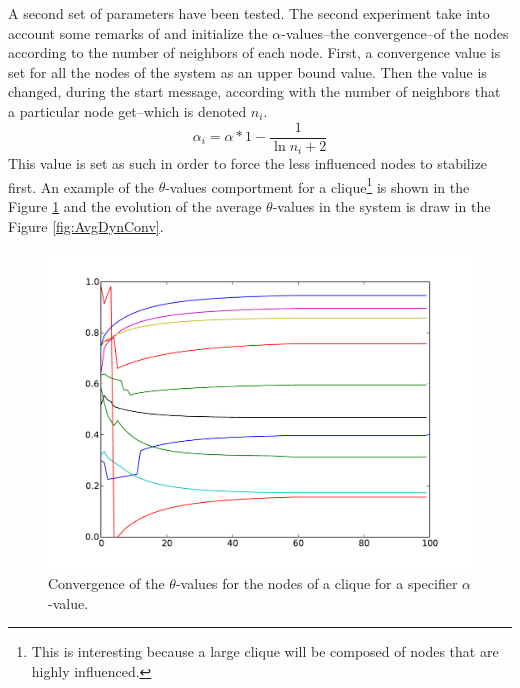 \documentclass[letterpaper]{article}
\begin{document}
A second set of parameters have been tested. The second experiment take into account some remarks of \cite{HH12} and initialize the $\alpha$-values--the convergence--of the nodes according to the number of neighbors of each node. First, a convergence value is set for all the nodes of the system as an upper bound value. Then the value is changed, during the start message, according with the number of neighbors that a particular node get--which is denoted $n_i$.
\begin{equation}
\alpha_i = \alpha * 1-\frac{1}{\ln{n_i + 2}}
\end{equation}
This value is set as such in order to force the less influenced nodes to stabilize first. An example of the $\theta$-values comportment for a clique\footnote{This is interesting because a large clique will be composed of nodes that are highly influenced.} is shown in the Figure \ref{fig:GeoPhaseDynConv} and the evolution of the average $\theta$-values in the system is draw in the Figure \ref{fig:AvgDynConv}.
\begin{figure}[h]
\centering
\includegraphics[scale=0.4]{./Figures/dyn_conv.pdf}
\caption{Convergence of the $\theta$-values for the nodes of a clique for a specifier $\alpha$-value.} \label{fig:GeoPhaseDynConv}
\end{figure}
\end{document}
